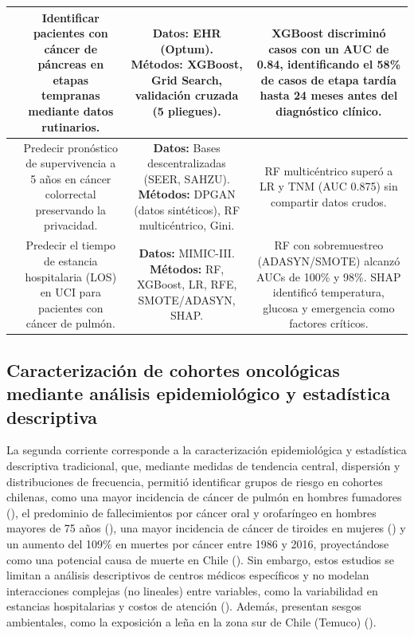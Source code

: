 \begin{table}[p]
\begin{tabular}{|c|c|c|c|}
\parbox[t]{1.2cm}{\centering \cite{article10}} & \parbox[t]{4.0cm}{Identificar pacientes con cáncer de páncreas en etapas tempranas mediante datos rutinarios.} & \parbox[t]{5.0cm}{\textbf{Datos:} EHR (Optum). \newline \textbf{Métodos:} XGBoost, Grid Search, validación cruzada (5 pliegues).} & \parbox[t]{5.0cm}{XGBoost discriminó casos con un AUC de 0.84, identificando el 58\% de casos de etapa tardía hasta 24 meses antes del diagnóstico clínico. } \\ \hline
\parbox[t]{1.2cm}{\centering \cite{article11}} & \parbox[t]{4.0cm}{Predecir pronóstico de supervivencia a 5 años en cáncer colorrectal preservando la privacidad.} & \parbox[t]{5.0cm}{\textbf{Datos:} Bases descentralizadas (SEER, SAHZU). \newline \textbf{Métodos:} DPGAN (datos sintéticos), RF multicéntrico, Gini. } & \parbox[t]{5.0cm}{RF multicéntrico superó a LR y TNM (AUC 0.875) sin compartir datos crudos.} \\ \hline
\parbox[t]{1.2cm}{\centering \cite{article16}} & \parbox[t]{4.0cm}{Predecir el tiempo de estancia hospitalaria (LOS) en UCI para pacientes con cáncer de pulmón.} & \parbox[t]{5.0cm}{\textbf{Datos:} MIMIC-III. \newline \textbf{Métodos:} RF, XGBoost, LR, RFE, SMOTE/ADASYN, SHAP. } & \parbox[t]{5.0cm}{RF con sobremuestreo (ADASYN/SMOTE) alcanzó AUCs de 100\% y 98\%. SHAP identificó temperatura, glucosa y emergencia como factores críticos. } \\ \hline
\end{tabular}
\end{table}


\subsection{Caracterización de cohortes oncológicas mediante análisis epidemiológico y estadística descriptiva}
\label{sec:caracterizacion_cohortes_estadistica}

La segunda corriente corresponde a la caracterización epidemiológica y estadística descriptiva tradicional, que, mediante medidas de tendencia central, dispersión y distribuciones de frecuencia, permitió identificar grupos de riesgo en cohortes chilenas, como una mayor incidencia de cáncer de pulmón en hombres fumadores (\cite{scielo1}), el predominio de fallecimientos por cáncer oral y orofaríngeo en hombres mayores de 75 años (\cite{scielo2}), una mayor incidencia de cáncer de tiroides en mujeres (\cite{scielo3}) y un aumento del 109\% en muertes por cáncer entre 1986 y 2016, proyectándose como una potencial causa de muerte en Chile (\cite{scielo4}). Sin embargo, estos estudios se limitan a análisis descriptivos de centros médicos específicos y no modelan interacciones complejas (no lineales) entre variables, como la variabilidad en estancias hospitalarias y costos de atención (\cite{Wodchis2016}). Además, presentan sesgos ambientales, como la exposición a leña en la zona sur de Chile (Temuco) (\cite{scielo1}).

